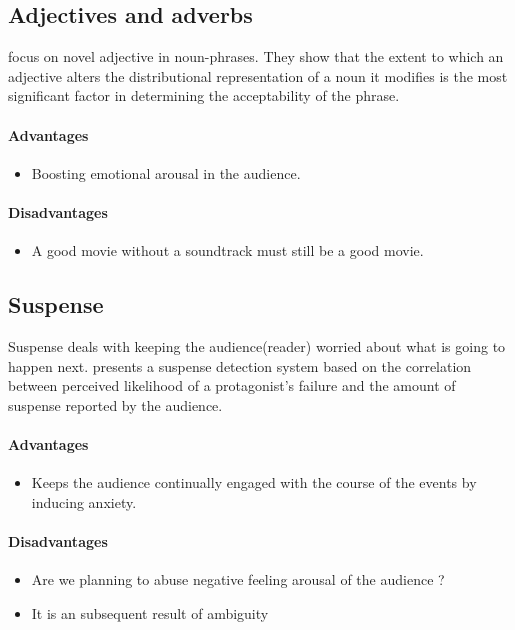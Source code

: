 \documentclass{article}
\begin{document}
			\subsection{Adjectives and adverbs}
			\citet{vecchi-2016-spicy-adjectives-and-nominal-donkeys-capturing-semantic-deviance-using-compositionality-in-distributional-spaces} focus on novel adjective in noun-phrases. They show that the extent to which an adjective alters the distributional representation of a noun it modifies is the most significant factor in determining the acceptability of the phrase.
				\paragraph{Advantages}
					\begin{itemize}
						\item Boosting emotional arousal in the audience. 
					\end{itemize}
				\paragraph{Disadvantages}
					\begin{itemize}
						\item A good movie without a soundtrack must still be a good movie.    
					\end{itemize}
			\subsection{Suspense}
			Suspense deals with keeping the audience(reader) worried about what is going to happen next. \citet{oneill-2011-toward-a-computational-framework-of-suspense-and-dramatic-arc} presents a suspense detection system based on the correlation between perceived likelihood of a protagonist’s failure and the amount of suspense reported by the audience.
				\paragraph{Advantages}
					\begin{itemize}
						\item Keeps the audience continually engaged with the course of the events by inducing anxiety.  
					\end{itemize}
				\paragraph{Disadvantages}
					\begin{itemize}
						\item Are we planning to abuse negative feeling arousal of the audience ? 
						\item It is an subsequent result of ambiguity 
					\end{itemize}
\end{document}
